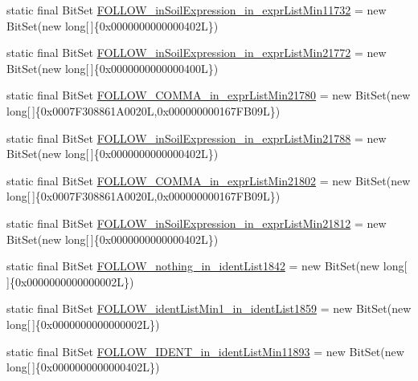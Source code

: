 \begin{DoxyCompactItemize}
static final Bit\-Set \hyperlink{classorg_1_1tzi_1_1use_1_1parser_1_1soil_1_1_soil_parser_ab0c11ce1923f8f7c001d9e9d4632bad9}{F\-O\-L\-L\-O\-W\-\_\-in\-Soil\-Expression\-\_\-in\-\_\-expr\-List\-Min11732} = new Bit\-Set(new long\mbox{[}$\,$\mbox{]}\{0x0000000000000402\-L\})
\item 
static final Bit\-Set \hyperlink{classorg_1_1tzi_1_1use_1_1parser_1_1soil_1_1_soil_parser_a4b16e7a8ae861dad3981a8bcca1a04bc}{F\-O\-L\-L\-O\-W\-\_\-in\-Soil\-Expression\-\_\-in\-\_\-expr\-List\-Min21772} = new Bit\-Set(new long\mbox{[}$\,$\mbox{]}\{0x0000000000000400\-L\})
\item 
static final Bit\-Set \hyperlink{classorg_1_1tzi_1_1use_1_1parser_1_1soil_1_1_soil_parser_afa46ebc96ede6f6697290a5727e82567}{F\-O\-L\-L\-O\-W\-\_\-\-C\-O\-M\-M\-A\-\_\-in\-\_\-expr\-List\-Min21780} = new Bit\-Set(new long\mbox{[}$\,$\mbox{]}\{0x0007\-F308861\-A0020\-L,0x000000000167\-F\-B09\-L\})
\item 
static final Bit\-Set \hyperlink{classorg_1_1tzi_1_1use_1_1parser_1_1soil_1_1_soil_parser_a3971605b0aa724c5d5545c8f24747ea0}{F\-O\-L\-L\-O\-W\-\_\-in\-Soil\-Expression\-\_\-in\-\_\-expr\-List\-Min21788} = new Bit\-Set(new long\mbox{[}$\,$\mbox{]}\{0x0000000000000402\-L\})
\item 
static final Bit\-Set \hyperlink{classorg_1_1tzi_1_1use_1_1parser_1_1soil_1_1_soil_parser_a6de0ac1ec195ecd428a92a7398b3f589}{F\-O\-L\-L\-O\-W\-\_\-\-C\-O\-M\-M\-A\-\_\-in\-\_\-expr\-List\-Min21802} = new Bit\-Set(new long\mbox{[}$\,$\mbox{]}\{0x0007\-F308861\-A0020\-L,0x000000000167\-F\-B09\-L\})
\item 
static final Bit\-Set \hyperlink{classorg_1_1tzi_1_1use_1_1parser_1_1soil_1_1_soil_parser_a419c40d3a8bd6f6c80bc4b983c645b98}{F\-O\-L\-L\-O\-W\-\_\-in\-Soil\-Expression\-\_\-in\-\_\-expr\-List\-Min21812} = new Bit\-Set(new long\mbox{[}$\,$\mbox{]}\{0x0000000000000402\-L\})
\item 
static final Bit\-Set \hyperlink{classorg_1_1tzi_1_1use_1_1parser_1_1soil_1_1_soil_parser_a99d4c9132a5912e3b5a400f0df7b37d0}{F\-O\-L\-L\-O\-W\-\_\-nothing\-\_\-in\-\_\-ident\-List1842} = new Bit\-Set(new long\mbox{[}$\,$\mbox{]}\{0x0000000000000002\-L\})
\item 
static final Bit\-Set \hyperlink{classorg_1_1tzi_1_1use_1_1parser_1_1soil_1_1_soil_parser_a3c13c64718d8ae79d82a065d31cc6460}{F\-O\-L\-L\-O\-W\-\_\-ident\-List\-Min1\-\_\-in\-\_\-ident\-List1859} = new Bit\-Set(new long\mbox{[}$\,$\mbox{]}\{0x0000000000000002\-L\})
\item 
static final Bit\-Set \hyperlink{classorg_1_1tzi_1_1use_1_1parser_1_1soil_1_1_soil_parser_abc046b12ee50aeff51d5ac21e305a145}{F\-O\-L\-L\-O\-W\-\_\-\-I\-D\-E\-N\-T\-\_\-in\-\_\-ident\-List\-Min11893} = new Bit\-Set(new long\mbox{[}$\,$\mbox{]}\{0x0000000000000402\-L\})

\end{DoxyCompactItemize}

